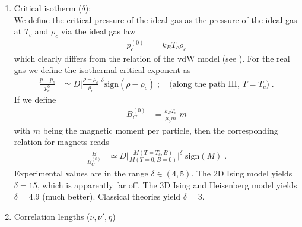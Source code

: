 \begin{enumerate}
\item Critical isotherm ($\delta$): \\
We define the critical pressure of the ideal gas as the pressure of the ideal gas at $T_{c}$ and 
$\rho_{c}$ via the ideal gas law
%
\begin{align*}
p_{c}^{(0)}&= k_{B}T_{c} \rho_{c}
\end{align*}
%
which clearly differs from the relation of the vdW model (see ).
For the real gas we define the isothermal critical exponent as
%
\begin{align}
\frac{p-p_{c}}{p_{c}^{0}} & \simeq D \bigg| \frac{\rho-\rho_{c}}{\rho_{c}}\bigg|^{\delta} \text{sign} (\rho-\rho_{c})\;;\quad \big(\text{along the path III, } T=T_{c}  \big)\;.
\end{align}
%
If we define 
%
\begin{align*}
B_{C}^{(0)} &= \frac{k_{B} T_{c}}{\mu_{0} m}\;m
\end{align*}
%
with $m$ being the magnetic moment  per particle, then the corresponding relation for magnets reads
%
\begin{align*}
\frac{B}{B_{C}^{(0)}} &\simeq D \bigg|
\frac{M(T=T_{c},B)}{M(T=0,B=0)}
\bigg|^{\delta} \;\text{sign} (M)\;.
\end{align*}
%
Experimental values are in the range $\delta\in (4,5)$. The 2D Ising model yields $\delta=15$, which is apparently
far off. The 3D Ising and Heisenberg model yields $\delta=4.9$ (much better). Classical theories 
yield $\delta=3$.

\item Correlation lengths ($\nu,\nu',\eta$)



\end{enumerate}
